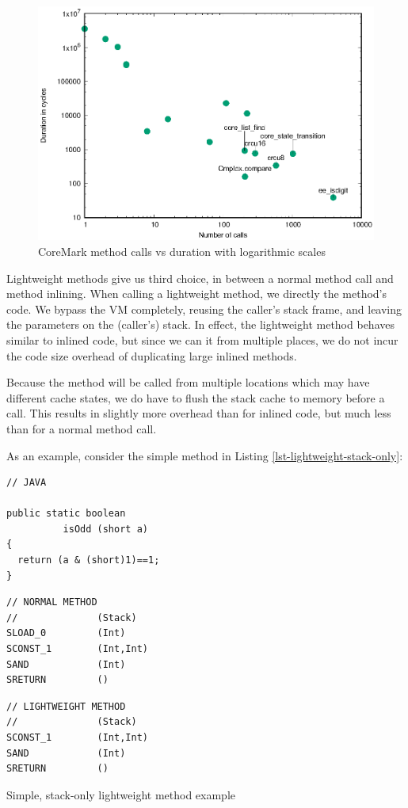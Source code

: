\begin{figure}
\centering
\includegraphics[width=.5\linewidth]{method-calls-vs-duration.eps}
\caption{CoreMark method calls vs duration with logarithmic scales}
\label{fig-coremark-method-calls-vs-duration}
\end{figure}

Lightweight methods give us third choice, in between a normal method call and method inlining. When calling a lightweight method, we directly  the method's code. We bypass the VM completely, reusing the caller's stack frame, and leaving the parameters on the (caller's) stack. In effect, the lightweight method behaves similar to inlined code, but since we can  it from multiple places, we do not incur the code size overhead of duplicating large inlined methods.

Because the method will be called from multiple locations which may have different cache states, we do have to flush the stack cache to memory before a call. This results in slightly more overhead than for inlined code, but much less than for a normal method call.

As an example, consider the simple  method in Listing \ref{lst-lightweight-stack-only}:

\begin{listing}
\centering
\begin{minipage}[t]{0.32\textwidth}
\centering
\begin{verbatim}
// JAVA

public static boolean
          isOdd (short a)
{
  return (a & (short)1)==1;
}
\end{verbatim}
\end{minipage}\hfill
\begin{minipage}[t]{0.29\textwidth}
\centering
\begin{verbatim}
// NORMAL METHOD
//              (Stack)
SLOAD_0         (Int)
SCONST_1        (Int,Int)
SAND            (Int)
SRETURN         ()
\end{verbatim}
\end{minipage}\hfill
\begin{minipage}[t]{0.29\textwidth}
\centering
\begin{verbatim}
// LIGHTWEIGHT METHOD
//              (Stack)
SCONST_1        (Int,Int)
SAND            (Int)
SRETURN         ()
\end{verbatim}
\end{minipage}
\caption{Simple, stack-only lightweight method example}
\label{lst-lightweight-stack-only}
\end{listing}

